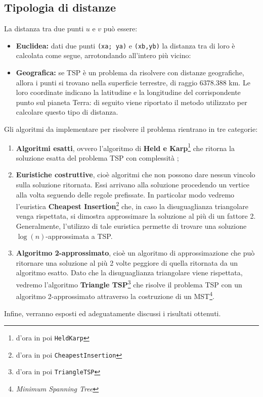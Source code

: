 \subsection{Tipologia di distanze}
\par La distanza tra due punti $u$ e $v$ può essere:
\begin{itemize}
	\item \textbf{Euclidea:} dati due punti \texttt{(xa; ya)} e \texttt{(xb,yb)} la distanza tra di loro è calcolata come segue, arrotondando all'intero più vicino:\\ 
	\item \textbf{Geografica:} se TSP è un problema da risolvere con distanze geografiche, allora i punti si trovano nella superficie terrestre, di raggio 6378.388 km. Le loro coordinate indicano la latitudine e la longitudine del corrispondente punto sul pianeta Terra: di seguito viene riportato il metodo utilizzato per calcolare questo tipo di distanza.\\
\end{itemize}\newpage
Gli algoritmi da implementare per risolvere il problema rientrano in tre categorie:
\begin{enumerate}
	\item \textbf{Algoritmi esatti}, ovvero l'algoritmo di \textbf{Held e Karp}\footnote{d'ora in poi \texttt{HeldKarp}} che ritorna la soluzione esatta del problema TSP con complessità ;
	\item \textbf{Euristiche costruttive}, cioè algoritmi che non possono dare nessun vincolo sulla soluzione ritornata. Essi arrivano alla soluzione procedendo un vertice alla volta seguendo delle regole prefissate. In particolar modo vedremo l'euristica \textbf{Cheapest Insertion}\footnote{d'ora in poi \texttt{CheapestInsertion}} che, in caso la disuguaglianza triangolare venga rispettata, si dimostra approssimare la soluzione al più di un fattore 2. Generalmente, l'utilizzo di tale euristica permette di trovare una soluzione $\log (n)$-approssimata a TSP.
	\item \textbf{Algoritmo 2-approssimato}, cioè un algoritmo di approssimazione che può ritornare una soluzione al più 2 volte peggiore di quella ritornata da un algoritmo esatto. Dato che la disuguaglianza triangolare viene rispettata, vedremo l'algoritmo \textbf{Triangle TSP}\footnote{d'ora in poi \texttt{TriangleTSP}} che risolve il problema TSP con un algoritmo 2-approssimato attraverso la costruzione di un MST\footnote{\emph{Minimum Spanning Tree}}.
\end{enumerate}
 Infine, verranno esposti ed adeguatamente discussi i risultati ottenuti.
 
